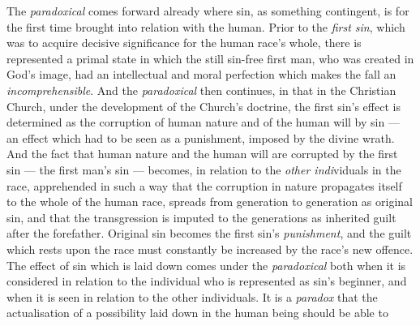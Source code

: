 \documentclass[12pt,a4paper]{book}
\begin{document}
The \emph{paradoxical} comes forward already where sin, as something contingent,
is for the first time brought into relation with the human. Prior to the
\emph{first sin}, which was to acquire decisive significance for the human
race's whole, there is represented a primal state in which the still sin-free
first man, who was created in God's image, had an intellectual and moral
perfection which makes the fall an \emph{incomprehensible}. And the
\emph{paradoxical} then continues, in that in the Christian Church, under the
development of the Church's doctrine, the
first sin's effect is determined as the corruption of human nature and of the
human will by sin --- an effect which had to be seen as a punishment, imposed by
the divine wrath. And the fact that human nature and the human will are
corrupted by the first sin --- the first man's sin --- becomes, in relation to
the \emph{other indi}viduals in the race, apprehended in such a way that the
corruption in nature propagates itself to the whole of the human race, spreads
from generation to generation as original sin, and that the transgression is
imputed to the generations as inherited guilt after the forefather. Original sin
becomes the first sin's \emph{punishment}, and the guilt which rests upon the
race must constantly be increased by the race's new offence. The effect of sin
which is laid down comes under the \emph{paradoxical} both when it is considered
in relation to the individual who is represented as sin's beginner, and when it
is seen in relation to the other individuals. It is a \emph{paradox} that the
actualisation of a possibility laid down in the human being should be able to
\end{document}
